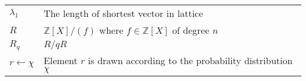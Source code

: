 \begin{center}
\begin{tabular}{ |l|l| }
		$\lambda_1$                       & The length of shortest vector in lattice                                                 \\
		$R$                               & $\mathbb{Z}[X] / ( f )$ where $f \in \mathbb{Z}[X]$ of degree $n$                        \\    
		$R_q$                             & $R/qR$                                                                                   \\
		$r \gets \chi$                    & Element $r$ is drawn according to the probability distribution $\chi$                    \\
		\hline                                                                            
	\end{tabular}
\end{center}

\newpage
